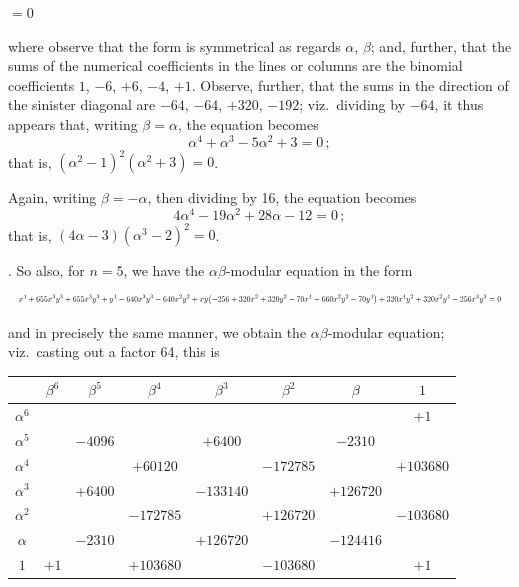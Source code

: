 \documentclass[11pt]{article}
\begin{document}
\noindent\hfill $= 0$

\medskip

\noindent where observe that the form is symmetrical as regards $\alpha$, $\beta$; and, further, that the sums of the numerical coefficients in the lines or columns are the binomial coefficients $1$, $-6$, $+6$, $-4$, $+1$. Observe, further, that the sums in the direction of the sinister diagonal are $-64$, $-64$, $+320$, $-192$; viz.\ dividing by $-64$, it thus appears that, writing $\beta = \alpha$, the equation becomes
\[
\alpha^4 + \alpha^3 - 5\alpha^2 + 3 = 0\,;
\]
that is, $(\alpha^2 - 1)^2(\alpha^2 + 3) = 0$.

\medskip

\noindent Again, writing $\beta = -\alpha$, then dividing by 16, the equation becomes
\[
4\alpha^4 - 19\alpha^2 + 28\alpha - 12 = 0\,;
\]
that is, $(4\alpha - 3)(\alpha^3 - 2)^2 = 0$.

\medskip

. So also, for $n=5$, we have the $\alpha\beta$-modular equation in the form
\[
\resizebox{\textwidth}{!}{$\displaystyle
x^4 + 65 5 x^3 y^3 + 655 x^3 y^3 + y^4 - 640 x^3 y^3 - 640 x^2 y^2
+ xy\bigl(-256 + 320 x^2 + 320 y^2 - 70 x^4 - 660 x^2 y^2 - 70 y^4\bigr) + 320 x^4 y^2 + 320 x^2 y^4 - 256 x^3 y^3
= 0
$}
\]

\noindent and in precisely the same manner, we obtain the $\alpha\beta$-modular equation; viz.\ casting out a factor 64, this is

\medskip

\begin{center}
\begin{tabular}{|c|c|c|c|c|c|c|c|}
\hline
 & $\beta^6$ & $\beta^5$ & $\beta^4$ & $\beta^3$ & $\beta^2$ & $\beta$ & $1$ \\
\hline
$\alpha^6$ & & & & & & & $+1$ \\
\hline
$\alpha^5$ & & $-4096$ & & $+6400$ & & $-2310$ & \\
\hline
$\alpha^4$ & & & $+60120$ & & $-172785$ & & $+103680$ \\
\hline
$\alpha^3$ & & $+6400$ & & $-133140$ & & $+126720$ & \\
\hline
$\alpha^2$ & & & $-172785$ & & $+126720$ & & $-103680$ \\
\hline
$\alpha$ & & $-2310$ & & $+126720$ & & $-124416$ & \\
\hline
$1$ & $+1$ & & $+103680$ & & $-103680$ & & $+1$ \\
\hline
\end{tabular}
\end{center}
\end{document}
